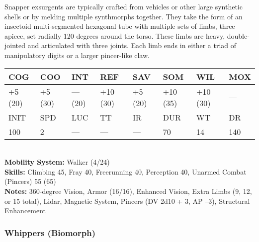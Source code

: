 Snapper exsurgents are typically crafted from vehicles or other large synthetic shells or by melding multiple synthmorphs together. They take the form of an insectoid multi-segmented hexagonal tube with multiple sets of limbs, three apiece, set radially 120 degrees around the torso. These limbs are heavy, double-jointed and articulated with three joints. Each limb ends in either a triad of manipulatory digits or a larger pincer-like claw. \\ \begin{tabular}{|l|l|l|l|l|l|l|l|} \hline

COG &COO &INT &REF &SAV &SOM &WIL &MOX \\ \hline

+5 (20) &+5 (30) &— (20) &+10 (30) &+5 (20) &+10 (35) &+10 (30) &— \\ \hline

INIT &SPD &LUC &TT &IR &DUR &WT &DR \\ \hline

100 &2 &— &— &— &70 &14 &140 \\ \hline

\end{tabular} \\ \textbf{Mobility System:} Walker (4/24) \\ \textbf{Skills:} Climbing 45, Fray 40, Freerunning 40, Perception 40, Unarmed Combat (Pincers) 55 (65) \\ \textbf{Notes: }360-degree Vision, Armor (16/16), Enhanced Vision, Extra Limbs (9, 12, or 15 total), Lidar, Magnetic System, Pincers (DV 2d10 + 3, AP –3), Structural Enhancement 

\subsubsection{Whippers (Biomorph)} 

